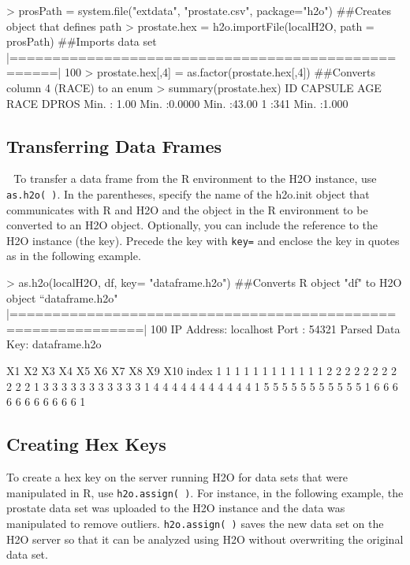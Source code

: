 \documentclass[11pt]{article}
\begin{document}
\begin{enumerate}
\begin{spverbatim}
> prosPath = system.file("extdata", "prostate.csv", package="h2o")
##Creates object that defines path
> prostate.hex = h2o.importFile(localH2O, path = prosPath)
##Imports data set
|===================================================| 100%
> prostate.hex[,4] = as.factor(prostate.hex[,4]) 
##Converts column 4 (RACE) to an enum
> summary(prostate.hex)
 ID               CAPSULE          AGE             RACE    DPROS
 Min.   :  1.00   Min.   :0.0000   Min.   :43.00   1 :341  Min.   :1.000
\end{spverbatim}


\subsection{Transferring Data Frames} 
To transfer a data frame from the R environment to the H2O instance, use  {\texttt{as.h2o( )}}. In the parentheses, specify the name of the h2o.init object that communicates with R and H2O and the object in the R environment to be converted to an H2O object. Optionally, you can include the reference to the H2O instance (the key). Precede the key with {\texttt{key=}} and enclose the key in quotes as in the following example. 

\begin{spverbatim}

> as.h2o(localH2O, df, key= "dataframe.h2o")
##Converts R object "df" to H2O object “dataframe.h2o"
  |=============================================================| 100%
IP Address: localhost 
Port      : 54321 
Parsed Data Key: dataframe.h2o 

  X1 X2 X3 X4 X5 X6 X7 X8 X9 X10 index
1  1  1  1  1  1  1  1  1  1   1     1
2  2  2  2  2  2  2  2  2  2   2     1
3  3  3  3  3  3  3  3  3  3   3     1
4  4  4  4  4  4  4  4  4  4   4     1
5  5  5  5  5  5  5  5  5  5   5     1
6  6  6  6  6  6  6  6  6  6   6     1
\end{spverbatim}


\subsection{Creating Hex Keys}

To create a hex key on the server running H2O for data sets that were manipulated in R, use {\texttt{h2o.assign( )}}. For instance, in the following example, the prostate data set was uploaded to the H2O instance and the data was manipulated to remove outliers. {\texttt{h2o.assign( )}} saves the new data set on the H2O server so that it can be analyzed using H2O without overwriting the original data set.  


\end{enumerate}
\end{document}
